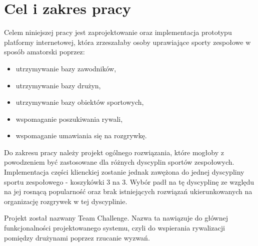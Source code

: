 \section{Cel i zakres pracy}

Celem niniejszej pracy jest zaprojektowanie oraz implementacja prototypu platformy internetowej, która zrzeszałaby osoby uprawiające sporty zespołowe w sposób amatorski poprzez:

\begin{itemize}
  \item utrzymywanie bazy zawodników,
  \item utrzymywanie bazy drużyn,
  \item utrzymywanie bazy obiektów sportowych,
  \item wspomaganie poszukiwania rywali,
  \item wspomaganie umawiania się na rozgrywkę.
\end{itemize} 

Do zakresu pracy należy projekt ogólnego rozwiązania, które mogłoby z powodzeniem być zastosowane dla różnych dyscyplin sportów zespołowych. Implementacja części klienckiej zostanie jednak zawężona do jednej dyscypliny sportu zespołowego - koszykówki 3 na 3. Wybór padł na tę dyscyplinę ze względu na jej rosnącą popularność oraz brak istniejących rozwiązań ukierunkowanych na organizację rozgrywek w tej dyscyplinie.

Projekt został nazwany Team Challenge. Nazwa ta nawiązuje do głównej funkcjonalności projektowanego systemu, czyli do wspierania rywalizacji pomiędzy drużynami poprzez rzucanie wyzwań.

\begin{comment}


Jako dyscyplina została wybrana koszykówka 3 na 3, która jest młodą . Projektowany system został nazwany Team Challenge. Nazwa ta nawiązuje do głównej funkcjonalności systemu jaką jest rzucanie wyzwań. "Team" odnosi się do głównej grupy docelowej systemu czyli drużyn. "Challenge" nawiązuje do funkcjonalności rzucania wyzwań. I coś że rózne formy wyzwań są popularne. IceBucket Challenge itp. I że może budzić z tego powodu zainteresowanie.

Projektowany system został nazwany Team Challenge. 

Ze względu na duży rozwój

TODO O tym że projekt ogólny a implementacja dla wybranej dziedziny a konkretnie koszykówki 3 na 3 która budzi co raz większe zainteresowanie i np będzie na igrzyskach olimpijskich. Wybór ze względu na popularność dyscypliny i brak dla niej istniejącego rozwiązania\cite{JS07}).
\end{comment}


